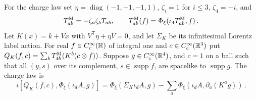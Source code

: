For the charge law set $\eta=\operatorname{diag}(-1,-1,-1,1)$, $\zeta_i=1$ for $i\le3$, $\zeta_4=-i$, and
\begin{equation*}
T^{\rm M}_{ab}=-\zeta_a\zeta_bT_{ab},\qquad
T^{\rm M}_{ab}(f)=\Phi_\xi(\iota_4T^{\rm M}_{ab},f)\,.
\end{equation*}
Let $K(x)=k+Vx$ with $V^{\mathsf T}\eta+\eta V=0$, and let $\Sigma_K$ be its infinitesimal Lorentz label action. For real $f\in C_c^\infty(\mathbb{R})$ of integral one and $c\in C_c^\infty(\mathbb{R}^3)$ put $Q_K(f,c)=\sum_b T^{\rm M}_{4b}(K^b(c\otimes f))$. Suppose $g\in C_c^\infty(\mathbb{R}^4)$, and $c=1$ on a ball such that all $(y,s)$ over its complement, $s\in\operatorname{supp}f$, are spacelike to $\operatorname{supp}g$. The charge law is
\begin{equation}\label{eq:H-charge}
i[Q_K(f,c),\Phi_\xi(\iota_dA,g)]
=\Phi_\xi(\Sigma_K\iota_dA,g)-\sum_a\Phi_\xi(\iota_dA,\partial_a(K^ag))\,.
\end{equation}

